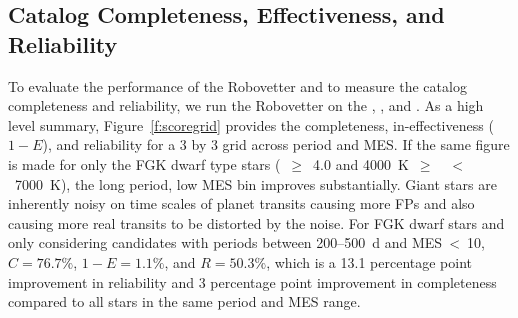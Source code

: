 \subsection{Catalog Completeness, Effectiveness, and Reliability}
\label{s:candr}

To evaluate the performance of the Robovetter and to measure the catalog completeness and reliability, we run the Robovetter on the , , and . As a high level summary, Figure~\ref{f:scoregrid} provides the completeness, in-effectiveness ($1-E$), and reliability for a 3 by 3 grid across period and MES. If the same figure is made for only the FGK dwarf type stars (\logg~$\ge$~4.0 and 4000~K~$\ge$~\tstar~$<$~7000~K), the long period, low MES bin improves substantially. Giant stars are inherently noisy on time scales of planet transits \citep[see Figure~9 of][]{Christiansen2012} causing more FPs and also causing more real transits to be distorted by the noise. For FGK dwarf stars and only considering candidates with periods between 200--500~d and MES~<~10, $C=76.7\%$, $1-E=1.1\%$, and $R=50.3\%$, which is a 13.1 percentage point improvement in reliability and 3 percentage point improvement in completeness compared to all stars in the same period and MES range.

